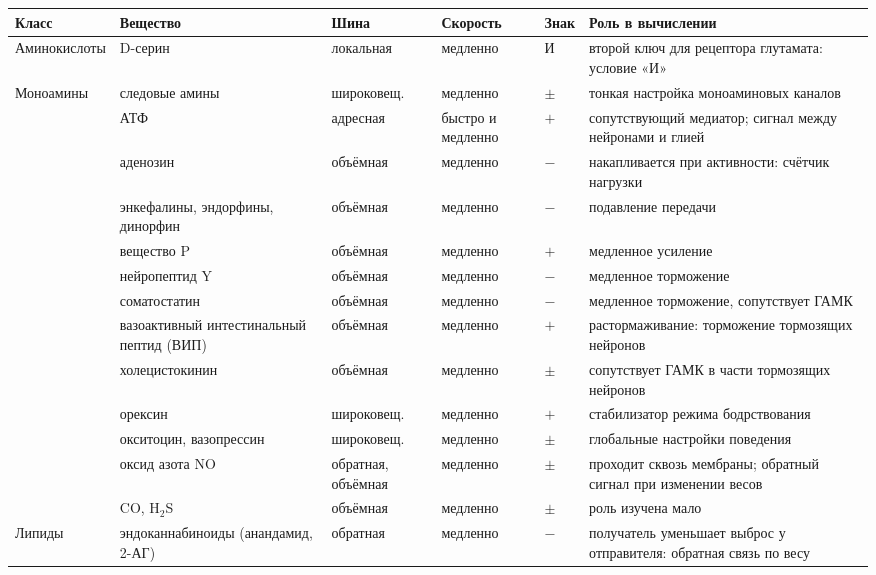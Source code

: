 \begin{table}[t]
\centering
\footnotesize
\setlength{\tabcolsep}{4pt}
\renewcommand{\arraystretch}{1.12}
\begin{tabular}{>{\raggedright}p{2.25cm}>{\raggedright}p{2.8cm}>{\raggedright}p{1.8cm}>{\raggedright}p{1.5cm}>{\centering}p{0.8cm}>{\raggedright\arraybackslash}p{4.3cm}}
\toprule
Класс & Вещество & Шина & Скорость & Знак & Роль в вычислении \\
\midrule
Аминокислоты & D-серин & локальная & медленно & И & второй ключ для рецептора глутамата: условие «И» \\
\midrule
Моноамины & следовые амины & широковещ. & медленно & $\pm$ & тонкая настройка моноаминовых каналов \\
\midrule
\multirow{2}{2.25cm}{Пурины}
 & АТФ & адресная & быстро и медленно & $+$ & сопутствующий медиатор; сигнал между нейронами и глией \\
 & аденозин & объёмная & медленно & $-$ & накапливается при активности: счётчик нагрузки~\cite{Dunwiddie2001} \\
\midrule
\multirow{8}{2.25cm}{Нейропептиды (больше сотни)}
 & энкефалины, эндорфины, динорфин & объёмная & медленно & $-$ & подавление передачи \\
 & вещество P & объёмная & медленно & $+$ & медленное усиление \\
 & нейропептид Y & объёмная & медленно & $-$ & медленное торможение \\
 & соматостатин & объёмная & медленно & $-$ & медленное торможение, сопутствует ГАМК \\
 & вазоактивный интестинальный пептид (ВИП) & объёмная & медленно & $+$ & растормаживание: торможение тормозящих нейронов \\
 & холецистокинин & объёмная & медленно & $\pm$ & сопутствует ГАМК в части тормозящих нейронов \\
 & орексин & широковещ. & медленно & $+$ & стабилизатор режима бодрствования \\
 & окситоцин, вазопрессин & широковещ. & медленно & $\pm$ & глобальные настройки поведения \\
\midrule
\multirow{2}{2.25cm}{Газы}
 & оксид азота NO & обратная, объёмная & медленно & $\pm$ & проходит сквозь мембраны; обратный сигнал при изменении весов~\cite{Garthwaite2008} \\
 & CO, H$_2$S & объёмная & медленно & $\pm$ & роль изучена мало \\
\midrule
Липиды & эндоканнабиноиды (анандамид, 2-АГ) & обратная & медленно & $-$ & получатель уменьшает выброс у отправителя: обратная связь по весу~\cite{WilsonNicoll2001} \\

\end{tabular}
\end{table}
